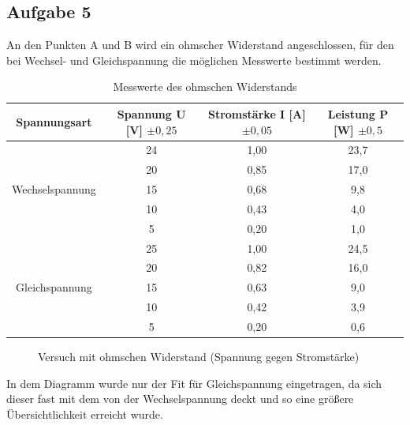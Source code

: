 \subsection{Aufgabe 5}
An den Punkten A und B wird ein ohmscher Widerstand angeschlossen, für den bei Wechsel- und Gleichspannung die möglichen Messwerte bestimmt werden.
\begin{table}[H]
  \centering
  \begin{tabular}{c | c | c | c}
    Spannungsart & Spannung U [V] $\pm0,25$ & Stromstärke I [A] $\pm 0,05$ & Leistung P [W] $\pm0,5$\\ \hline
     & 24 & 1,00 & 23,7\\
     & 20 & 0,85 & 17,0\\
     Wechselspannung & 15 & 0,68 & 9,8\\
     & 10 & 0,43 & 4,0\\
     & 5 & 0,20 & 1,0\\ \hline
     & 25 & 1,00 & 24,5\\
     & 20 & 0,82 & 16,0\\
     Gleichspannung & 15 & 0,63 & 9,0\\
     & 10 & 0,42 & 3,9\\
     & 5 & 0,20 & 0,6
  \end{tabular}
  \caption{Messwerte des ohmschen Widerstands}
  \label{tab:messungohm}
\end{table}
\begin{figure}[H]
  \centering
  \caption{Versuch mit ohmschen Widerstand (Spannung gegen Stromstärke)}
  \label{fig:UIOhmscher}
\end{figure}
In dem Diagramm wurde nur der Fit für Gleichspannung eingetragen, da sich dieser fast mit dem von der Wechselspannung deckt und so eine größere Übersichtlichkeit erreicht wurde.


